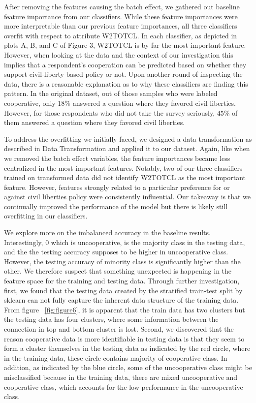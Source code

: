 After removing the features causing the batch effect, we gathered out baseline feature importance from our classifiers. While these feature importances were more interpretable than our previous feature importances, all three classifiers overfit with respect to attribute W2TOTCL. In each classifier, as depicted in plots A, B, and C of Figure 3, W2TOTCL is by far the most important feature. However, when looking at the data and the context of our investigation this implies that a respondent's cooperation can be predicted based on whether they support civil-liberty based policy or not. Upon another round of inspecting the data, there is a reasonable explanation as to why these classifiers are finding this pattern. In the original dataset, out of those samples who were labeled cooperative, only 18\% answered a question where they favored civil liberties. However, for those respondents who did not take the survey seriously, 45\% of them answered a question where they favored civil liberties. 
	
To address the overfitting we initially faced, we designed a data transformation as described in Data Transformation and applied it to our dataset. Again, like when we removed the batch effect variables, the feature importances became less centralized in the most important features. Notably, two of our three classifiers trained on transformed data did not identify W2TOTCL as the most important feature. However, features strongly related to a particular preference for or against civil liberties policy were consistently influential. Our takeaway is that we continually improved the performance of the model but there is likely still overfitting in our classifiers. 

We explore more on the imbalanced accuracy in the baseline results. Interestingly, 0 which is uncooperative, is the majority class in the testing data, and the the testing accuracy supposes to be higher in uncooperative class. However, the testing accuracy of minority class is significantly higher than the other. We therefore suspect that something unexpected is happening in the feature space for the training and testing data. Through further investigation, first, we found that the testing data created by the stratified train-test split by sklearn can not fully capture the inherent data structure of the training data. From figure ~\ref{fig:figure6}, it is apparent that the train data has two clusters but the testing data has four clusters, where some information between the connection in top and bottom cluster is lost. Second, we discovered that the reason cooperative data is more identifiable in testing data is that they seem to form a cluster themselves in the testing data as indicated by the red circle, where in the training data, these circle contains majority of cooperative class. In addition, as indicated by the blue circle, some of the uncooperative class might be misclassified because in the training data, there are mixed uncooperative and cooperative class, which accounts for the low performance in the uncooperative class.

